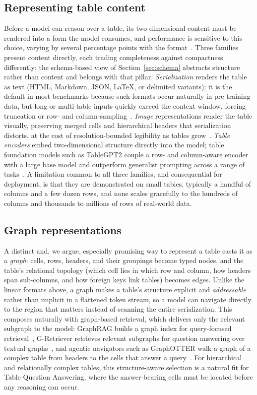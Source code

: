 \subsection{Representing table content}
\label{sec:representations}
Before a model can reason over a table, its two-dimensional content must be rendered into a form the model consumes, and performance is sensitive to this choice, varying by several percentage points with the format~\cite{sui2024table}. Three families present content directly, each trading completeness against compactness differently; the schema-based view of Section~\ref{sec:schema} abstracts structure rather than content and belongs with that pillar. \emph{Serialization} renders the table as text (HTML, Markdown, JSON, LaTeX, or delimited variants); it is the default in most benchmarks because such formats occur naturally in pre-training data, but long or multi-table inputs quickly exceed the context window, forcing truncation or row- and column-sampling~\cite{wu2025tabular}. \emph{Image} representations render the table visually, preserving merged cells and hierarchical headers that serialization distorts, at the cost of resolution-bounded legibility as tables grow~\cite{wu2025tabular}. \emph{Table encoders} embed two-dimensional structure directly into the model; table foundation models such as TableGPT2 couple a row- and column-aware encoder with a large base model and outperform generalist prompting across a range of tasks~\cite{su2024tablegpt2}. A limitation common to all three families, and consequential for deployment, is that they are demonstrated on small tables, typically a handful of columns and a few dozen rows, and none scales gracefully to the hundreds of columns and thousands to millions of rows of real-world data.

\subsection{Graph representations}
\label{sec:graph}
A distinct and, we argue, especially promising way to represent a table casts it as a \emph{graph}: cells, rows, headers, and their groupings become typed nodes, and the table's relational topology (which cell lies in which row and column, how headers span sub-columns, and how foreign keys link tables) becomes edges. Unlike the linear formats above, a graph makes a table's structure explicit and \emph{addressable} rather than implicit in a flattened token stream, so a model can navigate directly to the region that matters instead of scanning the entire serialization. This composes naturally with graph-based retrieval, which delivers only the relevant subgraph to the model: GraphRAG builds a graph index for query-focused retrieval~\cite{edge2024graphrag}, G-Retriever retrieves relevant subgraphs for question answering over textual graphs~\cite{he2024gretriever}, and agentic navigators such as GraphOTTER walk a graph of a complex table from headers to the cells that answer a query~\cite{li2025graphotter}. For hierarchical and relationally complex tables, this structure-aware selection is a natural fit for Table Question Answering, where the answer-bearing cells must be located before any reasoning can occur.

